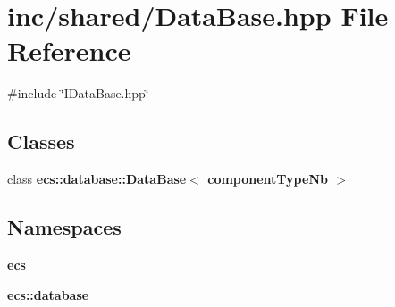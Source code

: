\section{inc/shared/\+Data\+Base.hpp File Reference}
\label{_data_base_8hpp}
{\ttfamily \#include \char`\"{}I\+Data\+Base.\+hpp\char`\"{}}\newline
\subsection*{Classes}
\begin{DoxyCompactItemize}
\item 
class {\bf ecs\+::database\+::\+Data\+Base$<$ component\+Type\+Nb $>$}
\end{DoxyCompactItemize}
\subsection*{Namespaces}
\begin{DoxyCompactItemize}
\item 
 {\bf ecs}
\item 
 {\bf ecs\+::database}
\end{DoxyCompactItemize}

